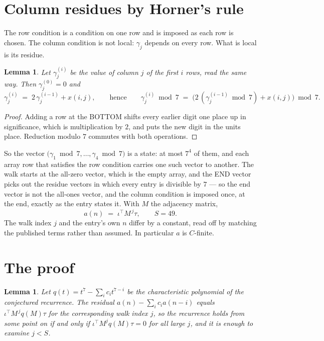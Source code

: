 \documentclass[11pt,a4paper]{article}
\theoremstyle{plain}
\newtheorem{lemma}[theorem]{Lemma}
\theoremstyle{definition}
\begin{document}
\section{Column residues by Horner's rule}

The row condition is a condition on one row and is imposed as each row is chosen. The column
condition is not local: $\gamma_j$ depends on every row. What is local is its residue.

\begin{lemma}\label{lem:horner}
Let $\gamma_j^{(i)}$ be the value of column $j$ of the first $i$ rows, read the same way.
Then $\gamma_j^{(0)}=0$ and
\[
\gamma_j^{(i)}\;=\;2\,\gamma_j^{(i-1)}+x(i,j),
\qquad\text{hence}\qquad
\gamma_j^{(i)}\bmod 7\;=\;
\bigl(2\,(\gamma_j^{(i-1)}\bmod 7)+x(i,j)\bigr)\bmod 7 .
\]
\end{lemma}

\begin{proof}
Adding a row at the BOTTOM shifts every earlier digit one place up in significance, which is
multiplication by $2$, and puts the new digit in the units place. Reduction modulo
$7$ commutes with both operations.
\end{proof}

So the vector $\bigl(\gamma_1\bmod 7,\dots,\gamma_{4}\bmod
7\bigr)$ is a state: at most $7^{4}$ of them, and each array row
that satisfies the row condition carries one such vector to another. The walk starts at the
all-zero vector, which is the empty array, and the END vector picks out the residue vectors in
which every entry is divisible by $7$ --- so the end vector is not the all-ones
vector, and the column condition is imposed once, at the end, exactly as the entry states it.
With $M$ the adjacency matrix,
\[
a(n)\;=\;\iota^{\!\top}M^{\,j}\tau ,\qquad S=49.
\]
The walk index $j$ and the entry's own $n$ differ by a constant, read off by matching the
published terms rather than assumed. In particular $a$ is $C$-finite.

\section{The proof}

\begin{lemma}\label{lem:crit}
Let $q(t)=t^{7}-\sum_i c_it^{7-i}$ be the characteristic polynomial of the
conjectured recurrence. The residual $a(n)-\sum_ic_ia(n-i)$ equals
$\iota^{\!\top}M^{\,j}q(M)\tau$ for the corresponding walk index $j$, so the recurrence
holds from some point on if and only if $\iota^{\!\top}M^{j}q(M)\tau=0$ for all large $j$,
and it is enough to examine $j<S$.
\end{lemma}
\end{document}
